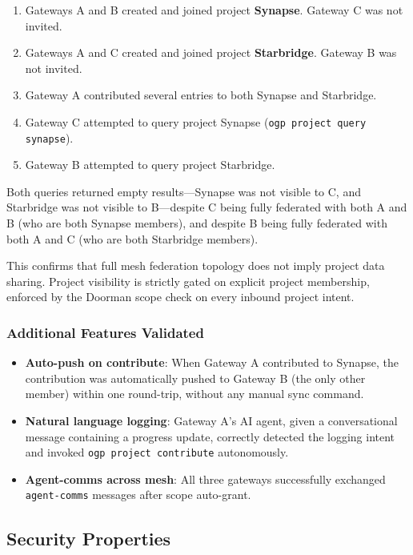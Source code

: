 \documentclass[conference]{IEEEtran}
\begin{document}
\begin{enumerate}
  \item Gateways A and B created and joined project \textbf{Synapse}. Gateway C was not invited.
  \item Gateways A and C created and joined project \textbf{Starbridge}. Gateway B was not invited.
  \item Gateway A contributed several entries to both Synapse and Starbridge.
  \item Gateway C attempted to query project Synapse (\texttt{ogp project query synapse}).
  \item Gateway B attempted to query project Starbridge.
\end{enumerate}

Both queries returned empty results---Synapse was not visible to C, and Starbridge was not visible to B---despite C being fully federated with both A and B (who are both Synapse members), and despite B being fully federated with both A and C (who are both Starbridge members).

This confirms that full mesh federation topology does not imply project data sharing. Project visibility is strictly gated on explicit project membership, enforced by the Doorman scope check on every inbound project intent.

\subsubsection{Additional Features Validated}

\begin{itemize}
  \item \textbf{Auto-push on contribute}: When Gateway A contributed to Synapse, the contribution was automatically pushed to Gateway B (the only other member) within one round-trip, without any manual sync command.
  \item \textbf{Natural language logging}: Gateway A's AI agent, given a conversational message containing a progress update, correctly detected the logging intent and invoked \texttt{ogp project contribute} autonomously.
  \item \textbf{Agent-comms across mesh}: All three gateways successfully exchanged \texttt{agent-comms} messages after scope auto-grant.
\end{itemize}

\subsection{Security Properties}
\end{document}

